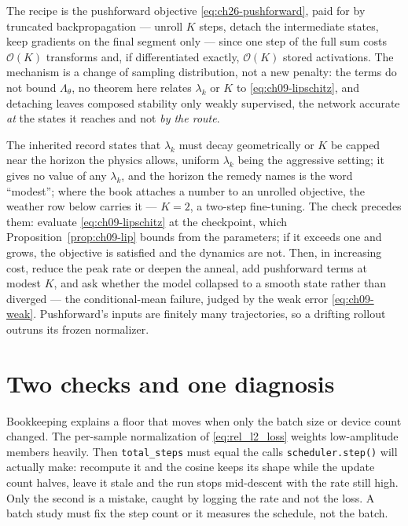 The recipe is the pushforward objective \eqref{eq:ch26-pushforward}, paid for by
truncated backpropagation --- unroll $K$ steps, detach the intermediate states,
keep gradients on the final segment only --- since one step of the full sum costs
$\mathcal{O}(K)$ transforms and, if differentiated exactly, $\mathcal{O}(K)$ stored
activations. The mechanism is a change of
sampling distribution, not a new penalty: the terms do not bound $\Lambda_\theta$, no
theorem here relates $\lambda_k$ or $K$ to \eqref{eq:ch09-lipschitz}, and detaching
leaves composed stability only weakly supervised, the network accurate \emph{at} the
states it reaches and not \emph{by the route}.

The inherited record states that $\lambda_k$ must decay geometrically or $K$ be
capped near the horizon the physics allows, uniform $\lambda_k$ being the aggressive
setting; it gives no value of any $\lambda_k$, and the horizon the remedy names is the
word ``modest''; where the book attaches a number to an unrolled objective, the
weather row below carries it --- $K=2$, a two-step fine-tuning. The check precedes
them: evaluate
\eqref{eq:ch09-lipschitz} at the checkpoint, which Proposition~\ref{prop:ch09-lip}
bounds from the parameters; if it exceeds one and grows, the objective is satisfied
and the dynamics are not. Then, in increasing cost, reduce the peak rate or deepen
the anneal, add pushforward terms at modest $K$, and ask whether the model collapsed
to a smooth state rather than diverged --- the conditional-mean failure, judged by
the weak error \eqref{eq:ch09-weak}. Pushforward's inputs are finitely many
trajectories, so a drifting rollout outruns its frozen normalizer.

\section{Two checks and one diagnosis}
\label{sec:appd-checks}

Bookkeeping explains a floor that moves when only the batch size or device count
changed. The per-sample normalization of \eqref{eq:rel_l2_loss} weights
low-amplitude members heavily. Then \texttt{total\_steps} must equal the calls
\texttt{scheduler.step()} will actually make: recompute it and the cosine keeps its
shape while the update count halves, leave it stale and the run stops mid-descent
with the rate still high. Only the second is a mistake, caught by logging the rate
and not the loss. A batch study must fix the step count or it measures the
schedule, not the batch.

